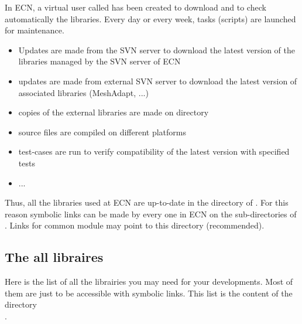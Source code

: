 In ECN, a virtual user called 
has been created to download and to check automatically the libraries. Every day or
every week, tasks (scripts) are launched for maintenance.
\begin{itemize}
\item Updates are made from the SVN server to download the latest version of the libraries managed by the SVN server of ECN
\item updates are made from  external SVN server to download the latest version of associated libraries (MeshAdapt, ...)
\item copies of the external libraries  are made on directory   
\item source files are compiled on different platforms 
\item test-cases are run to verify compatibility of the latest version with specified tests
\item ...
\end{itemize}

Thus, all the libraries used at ECN are up-to-date in the 
directory of . For this reason symbolic links can
be made by every one in  ECN on the sub-directories of \\
. Links for common module may point to this
directory (recommended).


\subsection{The all libraires}

Here is the list of all the librairies you may need for your developments. Most of them are just to be accessible with symbolic links. This list is the content of the directory\\ .\\


